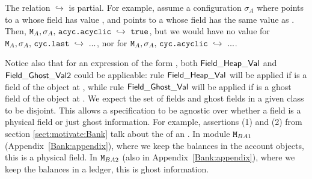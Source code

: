 The relation $ \hookrightarrow$ is partial. 
For example, assume   a configuration
$\sigma_A$ where
 points to a  whose field  has value , and   
 points to a  whose field  has the same value as . Then,   
$\M_A,\sigma_A,\,\prg{acyc.acyclic}  \ \hookrightarrow\  \prg{true}$, but we would have no value for 
$\M_A,\sigma_A,\, \prg{cyc.last}  \ \hookrightarrow\  ...$, nor for
$\M_A,\sigma_A,\, \prg{cyc.acyclic}  \ \hookrightarrow\  ...$.

Notice also that for an expression of the form  
, both ${\sf {Field\_Heap\_Val}}$ and ${\sf {Field\_Ghost\_Val2}}$ could be applicable: rule ${\sf {Field\_Heap\_Val}}$
will be applied if  is a field of the object at , while rule ${\sf {Field\_Ghost\_Val}}$
will be applied if  is a ghost field of the object at . We expect the set of fields and ghost fields in a 
given class to be disjoint.
This allows a specification to be agnostic over whether a field is a physical field or just ghost information.
For example, assertions (1) and (2) from  section  \ref{sect:motivate:Bank}
 talk about the  of an . 
In module ${\mbox{\tt{\ensuremath{{\mbox{\tt{M}}}}}}}_{BA1}$ (Appendix~\ref{Bank:appendix}), where we keep the balances in the account objects, this is a physical field. 
In ${\mbox{\tt{\ensuremath{{\mbox{\tt{M}}}}}}}_{BA2}$ (also in Appendix~\ref{Bank:appendix}), where we keep the
balances in a ledger, this is ghost information.  
 

